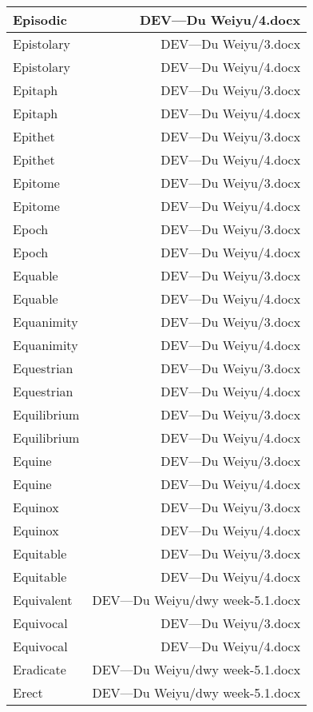 \documentclass{article}
\begin{document}
\begin{center}
\begin{longtable}{|l|r|}
\hline
Episodic  &  DEV---Du Weiyu/4.docx\\  
\hline
Epistolary  &  DEV---Du Weiyu/3.docx\\  
\hline
Epistolary  &  DEV---Du Weiyu/4.docx\\  
\hline
Epitaph  &  DEV---Du Weiyu/3.docx\\  
\hline
Epitaph  &  DEV---Du Weiyu/4.docx\\  
\hline
Epithet  &  DEV---Du Weiyu/3.docx\\  
\hline
Epithet  &  DEV---Du Weiyu/4.docx\\  
\hline
Epitome  &  DEV---Du Weiyu/3.docx\\  
\hline
Epitome  &  DEV---Du Weiyu/4.docx\\  
\hline
Epoch  &  DEV---Du Weiyu/3.docx\\  
\hline
Epoch  &  DEV---Du Weiyu/4.docx\\  
\hline
Equable  &  DEV---Du Weiyu/3.docx\\  
\hline
Equable  &  DEV---Du Weiyu/4.docx\\  
\hline
Equanimity  &  DEV---Du Weiyu/3.docx\\  
\hline
Equanimity  &  DEV---Du Weiyu/4.docx\\  
\hline
Equestrian  &  DEV---Du Weiyu/3.docx\\  
\hline
Equestrian  &  DEV---Du Weiyu/4.docx\\  
\hline
Equilibrium  &  DEV---Du Weiyu/3.docx\\  
\hline
Equilibrium  &  DEV---Du Weiyu/4.docx\\  
\hline
Equine  &  DEV---Du Weiyu/3.docx\\  
\hline
Equine  &  DEV---Du Weiyu/4.docx\\  
\hline
Equinox  &  DEV---Du Weiyu/3.docx\\  
\hline
Equinox  &  DEV---Du Weiyu/4.docx\\  
\hline
Equitable  &  DEV---Du Weiyu/3.docx\\  
\hline
Equitable  &  DEV---Du Weiyu/4.docx\\  
\hline
Equivalent  &  DEV---Du Weiyu/dwy week-5.1.docx\\  
\hline
Equivocal  &  DEV---Du Weiyu/3.docx\\  
\hline
Equivocal  &  DEV---Du Weiyu/4.docx\\  
\hline
Eradicate  &  DEV---Du Weiyu/dwy week-5.1.docx\\  
\hline
Erect  &  DEV---Du Weiyu/dwy week-5.1.docx\\  

\end{longtable}
\end{center}
\end{document}
